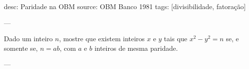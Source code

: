 desc: Paridade na OBM
source:  OBM Banco 1981
tags:  [divisibilidade, fatoração]

---

Dado um inteiro $n$, mostre que existem inteiros $x$ e $y$ tais que $x^2 - y^2 = n$ se, e somente se, $n = ab$, com $a$ e $b$ inteiros de mesma paridade.

---

